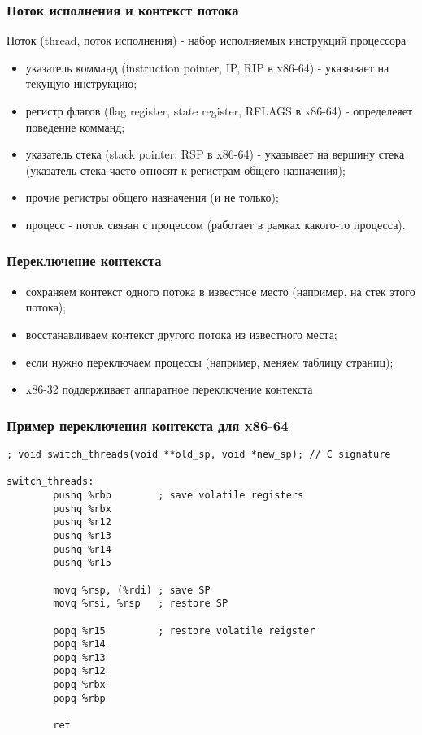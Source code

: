 \begin{frame}
\frametitle{Поток исполнения и контекст потока}
Поток (thread, поток исполнения) - набор исполняемых инструкций процессора
\begin{itemize}
  \item указатель комманд (instruction pointer, IP, RIP в x86-64) - указывает на
        текущую инструкцию;
  \item регистр флагов (flag register, state register, RFLAGS в x86-64) -
        определеяет поведение комманд;
  \item указатель стека (stack pointer, RSP в x86-64) - указывает на вершину
        стека (указатель стека часто относят к регистрам общего назначения);
  \item прочие регистры общего назначения (и не только);
  \item процесс - поток связан с процессом (работает в рамках какого-то
        процесса).
\end{itemize}
\end{frame}

\begin{frame}
\frametitle{Переключение контекста}

\begin{itemize}
  \item сохраняем контекст одного потока в известное место (например, на стек
        этого потока);
  \item восстанавливаем контекст другого потока из известного места;
  \item если нужно переключаем процессы (например, меняем таблицу страниц);
  \item x86-32 поддерживает аппаратное переключение контекста
\end{itemize}
\end{frame}

\begin{frame}[fragile]
\frametitle{Пример переключения контекста для x86-64}

\begin{lstlisting}
; void switch_threads(void **old_sp, void *new_sp); // C signature

switch_threads:
        pushq %rbp        ; save volatile registers
        pushq %rbx
        pushq %r12
        pushq %r13
        pushq %r14
        pushq %r15

        movq %rsp, (%rdi) ; save SP
        movq %rsi, %rsp   ; restore SP

        popq %r15         ; restore volatile reigster
        popq %r14
        popq %r13
        popq %r12
        popq %rbx
        popq %rbp

        ret
\end{lstlisting}
\end{frame}


